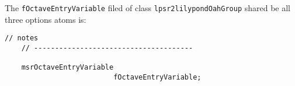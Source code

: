 The {\tt fOctaveEntryVariable} filed of class {\tt lpsr2lilypondOahGroup} shared be all three options atoms is:
\begin{lstlisting}[language=CPlusPlus]
    // notes
    // --------------------------------------

    msrOctaveEntryVariable
                          fOctaveEntryVariable;
\end{lstlisting}

